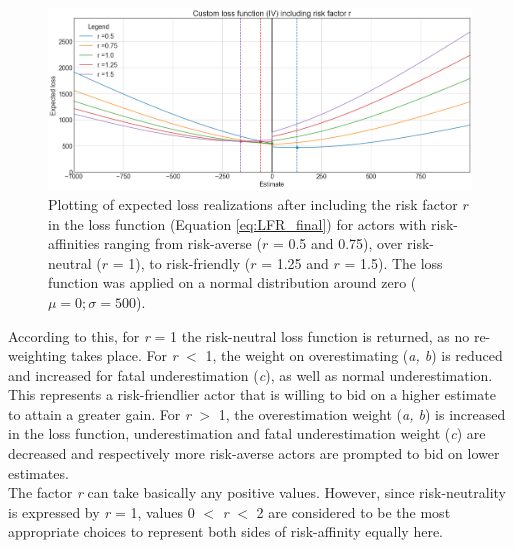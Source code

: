 		\begin{figure}[h]
			\centering
			\includegraphics[width=1\textwidth]{Figures/LFR_normal2.png}
			\caption{Plotting of expected loss realizations after including the risk factor $r$ in the loss function (Equation \ref{eq:LFR_final}) for actors with risk-affinities ranging from risk-averse ($r$ = 0.5 and 0.75), over risk-neutral ($r$ = 1), to risk-friendly ($r$ = 1.25 and $r$ = 1.5). The loss function was applied on a normal distribution around zero ($\mu=0; \sigma=500$).}\label{fig:LFR_normal} 
		\end{figure}
		According to this, for \textit{r} = 1 the risk-neutral loss function is returned, as no re-weighting takes place. For \textit{r} $<$ 1, the weight on overestimating (\textit{a, b}) is reduced and increased for fatal underestimation (\textit{c}), as well as normal underestimation. This represents a risk-friendlier actor that is willing to bid on a higher estimate to attain a greater gain. For \textit{r} $>$ 1, the overestimation weight (\textit{a, b}) is increased in the loss function, underestimation and fatal underestimation weight (\textit{c}) are decreased and respectively more risk-averse actors are prompted to bid on lower estimates.\\		
		The factor \textit{r} can take basically any positive values. However, since risk-neutrality is expressed by \textit{r} = 1, values 0 $<$ \textit{r} $<$ 2 are considered to be the most appropriate choices to represent both sides of risk-affinity equally here.		
		
